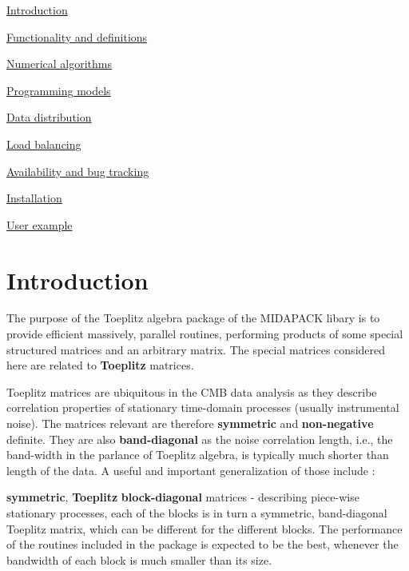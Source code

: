 
\begin{DoxyItemize}
\item \hyperlink{toeplitz_intro}{Introduction}
\item \hyperlink{toeplitz_functionality}{Functionality and definitions}
\item \hyperlink{toeplitz_algo}{Numerical algorithms}
\item \hyperlink{toeplitz_progmodels}{Programming models}
\item \hyperlink{toeplitz_datadistr}{Data distribution}
\item \hyperlink{toeplitz_loadbalancing}{Load balancing}
\item \hyperlink{toeplitz_avail}{Availability and bug tracking}
\item \hyperlink{toeplitz_install}{Installation}
\item \hyperlink{toeplitz_example}{User example} 
\end{DoxyItemize}\section{Introduction}\label{toeplitz_intro}
The purpose of the Toeplitz algebra package of the M\-I\-D\-A\-P\-A\-C\-K libary is to provide efficient massively, parallel routines, performing products of some special structured matrices and an arbitrary matrix. The special matrices considered here are related to {\bfseries Toeplitz} matrices.

Toeplitz matrices are ubiquitous in the C\-M\-B data analysis as they describe correlation properties of stationary time-\/domain processes (usually instrumental noise). The matrices relevant are therefore {\bfseries symmetric} and {\bfseries non-\/negative} definite. They are also {\bfseries band-\/diagonal} as the noise correlation length, i.\-e., the band-\/width in the parlance of Toeplitz algebra, is typically much shorter than length of the data. A useful and important generalization of those include \-:
\begin{DoxyItemize}
\item {\bfseries symmetric}, {\bfseries Toeplitz} {\bfseries block-\/diagonal} matrices -\/ describing piece-\/wise stationary processes, each of the blocks is in turn a symmetric, band-\/diagonal Toeplitz matrix, which can be different for the different blocks. The performance of the routines included in the package is expected to be the best, whenever the bandwidth of each block is much smaller than its size.
\end{DoxyItemize}


